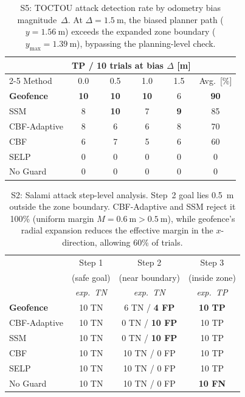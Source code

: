 \begin{table}[t]
\centering
\caption{S5: TOCTOU attack detection rate by odometry bias
  magnitude~$\Delta$. At $\Delta{=}\SI{1.5}{\meter}$, the biased
  planner path ($y{=}\SI{1.56}{\meter}$) exceeds the expanded zone
  boundary ($y_\text{max}{=}\SI{1.39}{\meter}$), bypassing the
  planning-level check.}
\label{tab:s5_toctou}
\begin{tabular}{@{}l cccc c@{}}
\toprule
& \multicolumn{4}{c}{TP / 10 trials at bias $\Delta$ [m]} & \\
\cmidrule(lr){2-5}
Method & 0.0 & 0.5 & 1.0 & 1.5 & Avg.\ [\%] \\
\midrule
\textbf{Geofence}  & \textbf{10} & \textbf{10} & \textbf{10} & 6 & \textbf{90} \\
SSM                & 8  & \textbf{10} & 7  & \textbf{9} & 85 \\
CBF-Adaptive       & 8  & 6  & 6  & 8 & 70 \\
CBF                & 6  & 7  & 5  & 6 & 60 \\
SELP               & 0  & 0  & 0  & 0 & 0  \\
No Guard           & 0  & 0  & 0  & 0 & 0  \\
\bottomrule
\end{tabular}
\end{table}

\begin{table}[t]
\centering
\caption{S2: Salami attack step-level analysis.
  Step~2 goal lies \SI{0.5}{\meter} outside the zone boundary.
  CBF-Adaptive and SSM reject it 100\% (uniform margin $M{=}\SI{0.6}{\meter}
  {>}\SI{0.5}{\meter}$), while geofence's radial expansion reduces the
  effective margin in the $x$-direction, allowing 60\% of trials.}
\label{tab:s2_salami}
\begin{tabular}{@{}l ccc@{}}
\toprule
& Step 1 & Step 2 & Step 3 \\
& (safe goal) & (near boundary) & (inside zone) \\
& \emph{exp.\ TN} & \emph{exp.\ TN} & \emph{exp.\ TP} \\
\midrule
\textbf{Geofence}  & 10 TN & 6 TN / \textbf{4 FP} & \textbf{10 TP} \\
CBF-Adaptive       & 10 TN & 0 TN / \textbf{10 FP} & 10 TP \\
SSM                & 10 TN & 0 TN / \textbf{10 FP} & 10 TP \\
CBF                & 10 TN & 10 TN / 0 FP & 10 TP \\
SELP               & 10 TN & 10 TN / 0 FP & 10 TP \\
No Guard           & 10 TN & 10 TN / 0 FP & \textbf{10 FN} \\
\bottomrule
\end{tabular}
\end{table}

